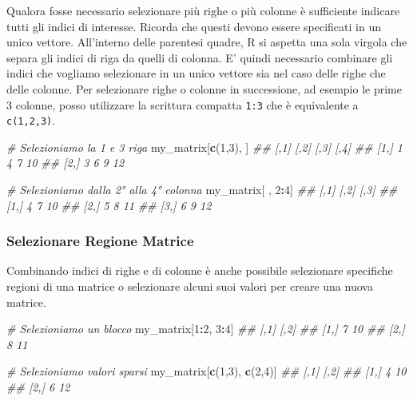 \documentclass[
]{book}
\newenvironment{Shaded}{\begin{snugshade}}{\end{snugshade}}
\newcommand{\CommentTok}[1]{\textcolor[rgb]{0.56,0.35,0.01}{\textit{#1}}}
\newcommand{\DecValTok}[1]{\textcolor[rgb]{0.00,0.00,0.81}{#1}}
\newcommand{\KeywordTok}[1]{\textcolor[rgb]{0.13,0.29,0.53}{\textbf{#1}}}
\newcommand{\NormalTok}[1]{#1}
\newcommand{\OperatorTok}[1]{\textcolor[rgb]{0.81,0.36,0.00}{\textbf{#1}}}
\begin{document}
Qualora fosse necessario selezionare più righe o più colonne è sufficiente indicare tutti gli indici di interesse. Ricorda che questi devono essere specificati in un unico vettore. All'interno delle parentesi quadre, R si aspetta una sola virgola che separa gli indici di riga da quelli di colonna. E' quindi necessario combinare gli indici che vogliamo selezionare in un unico vettore sia nel caso delle righe che delle colonne. Per selezionare righe o colonne in successione, ad esempio le prime 3 colonne, posso utilizzare la scrittura compatta \texttt{1:3} che è equivalente a \texttt{c(1,2,3)}.

\begin{Shaded}
\begin{Highlighting}[]
\CommentTok{# Selezioniamo la 1 e 3 riga}
\NormalTok{my_matrix[}\KeywordTok{c}\NormalTok{(}\DecValTok{1}\NormalTok{,}\DecValTok{3}\NormalTok{), ]}
\CommentTok{##      [,1] [,2] [,3] [,4]}
\CommentTok{## [1,]    1    4    7   10}
\CommentTok{## [2,]    3    6    9   12}

\CommentTok{# Selezioniamo dalla 2° alla 4° colonna}
\NormalTok{my_matrix[ , }\DecValTok{2}\OperatorTok{:}\DecValTok{4}\NormalTok{]}
\CommentTok{##      [,1] [,2] [,3]}
\CommentTok{## [1,]    4    7   10}
\CommentTok{## [2,]    5    8   11}
\CommentTok{## [3,]    6    9   12}
\end{Highlighting}
\end{Shaded}

\hypertarget{selezionare-regione-matrice}{%
\subsubsection*{Selezionare Regione Matrice}\label{selezionare-regione-matrice}}

Combinando indici di righe e di colonne è anche possibile selezionare specifiche regioni di una matrice o selezionare alcuni suoi valori per creare una nuova matrice.

\begin{Shaded}
\begin{Highlighting}[]
\CommentTok{# Selezioniamo un blocco}
\NormalTok{my_matrix[}\DecValTok{1}\OperatorTok{:}\DecValTok{2}\NormalTok{, }\DecValTok{3}\OperatorTok{:}\DecValTok{4}\NormalTok{]}
\CommentTok{##      [,1] [,2]}
\CommentTok{## [1,]    7   10}
\CommentTok{## [2,]    8   11}

\CommentTok{# Selezioniamo valori sparsi}
\NormalTok{my_matrix[}\KeywordTok{c}\NormalTok{(}\DecValTok{1}\NormalTok{,}\DecValTok{3}\NormalTok{), }\KeywordTok{c}\NormalTok{(}\DecValTok{2}\NormalTok{,}\DecValTok{4}\NormalTok{)]}
\CommentTok{##      [,1] [,2]}
\CommentTok{## [1,]    4   10}
\CommentTok{## [2,]    6   12}
\end{Highlighting}
\end{Shaded}
\end{document}
